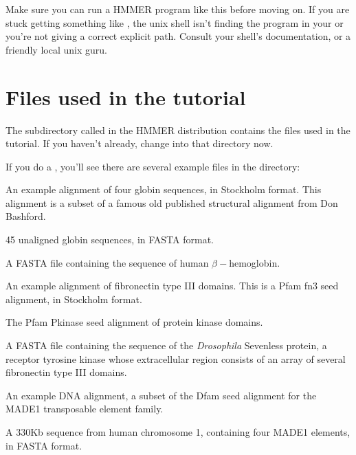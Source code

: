   \vspace{1ex}
  \vspace{1ex}

Make sure you can run a HMMER program like this before moving on.  If
you are stuck getting something like , the unix shell isn't finding the program in your 
or you're not giving a correct explicit path. Consult your shell's
documentation, or a friendly local unix guru.

\section{Files used in the tutorial}

The subdirectory called  in the HMMER distribution
contains the files used in the tutorial. If you haven't already,
change into that directory now. 

  \vspace{1ex}
  \vspace{1ex}

If you do a , you'll see there are several example files in
the  directory:

\begin{sreitems}{}
\item[\monob{globins4.sto}] An example alignment of four globin sequences, in
  Stockholm format. This alignment is a subset of a famous old
  published structural alignment from Don Bashford.\cite{Bashford87}
%
\item[\monob{globins45.fa}] 45 unaligned globin sequences, in FASTA
  format.
%
\item[\monob{HBB\_HUMAN}] A FASTA file containing the sequence of
  human $\beta-$hemoglobin.
%
\item[\monob{fn3.sto}] An example alignment of fibronectin type III
  domains. This is a Pfam fn3 seed alignment, in Stockholm format.
%
\item[\monob{Pkinase.sto}] The Pfam Pkinase seed alignment of protein
  kinase domains.
%
\item[\monob{7LESS\_DROME}] A FASTA file containing the sequence of
  the \emph{Drosophila} Sevenless protein, a receptor tyrosine kinase
  whose extracellular region consists of an array of several
  fibronectin type III domains.
%
\item[\monob{MADE1.sto}] An example DNA alignment, a subset
of the Dfam seed alignment for the MADE1 transposable element family. 
%
\item[\monob{dna\_target.fa}] A 330Kb sequence from human chromosome
  1, containing four MADE1 elements, in FASTA format.
\end{sreitems}


